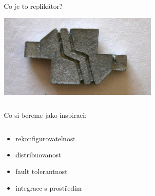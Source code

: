 \documentclass{beamer}
\begin{document}
\begin{frame}{Co je to replikátor?}
    \begin{center}
        \includegraphics[width=0.6\textwidth]{img/replicator3}
    \end{center}

    \begin{columns}
        \begin{column}{0.5\textwidth}
            Co si bereme jako inspiraci:
        \end{column}
        \begin{column}{0.5\textwidth}
        \end{column}
    \end{columns}

    \begin{columns}
        \begin{column}{0.5\textwidth}
            \begin{itemize}
                \item rekonfigurovatelnost
                \item distribuovanost
                \item fault tolerantnost
                \item integrace s prostředím
            \end{itemize}
        \end{column}
        \begin{column}{0.5\textwidth}
        \end{column}
    \end{columns}
\end{frame}
\end{document}
